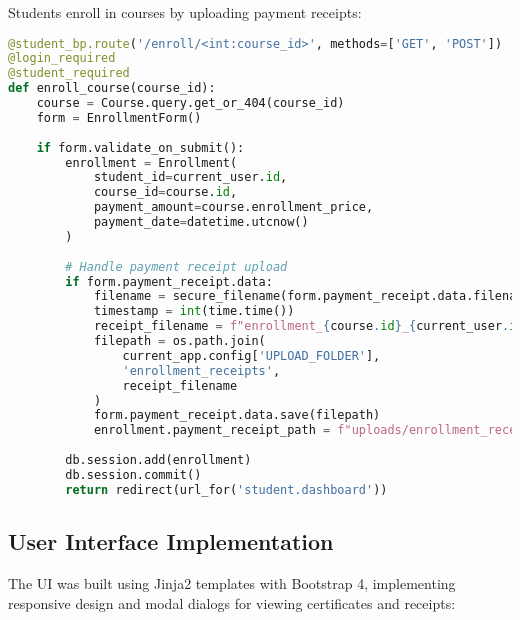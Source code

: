 Students enroll in courses by uploading payment receipts:

\begin{lstlisting}[language=Python, caption=Student Enrollment, label=lst:enrollment]
@student_bp.route('/enroll/<int:course_id>', methods=['GET', 'POST'])
@login_required
@student_required
def enroll_course(course_id):
    course = Course.query.get_or_404(course_id)
    form = EnrollmentForm()
    
    if form.validate_on_submit():
        enrollment = Enrollment(
            student_id=current_user.id,
            course_id=course.id,
            payment_amount=course.enrollment_price,
            payment_date=datetime.utcnow()
        )
        
        # Handle payment receipt upload
        if form.payment_receipt.data:
            filename = secure_filename(form.payment_receipt.data.filename)
            timestamp = int(time.time())
            receipt_filename = f"enrollment_{course.id}_{current_user.id}_{timestamp}_{filename}"
            filepath = os.path.join(
                current_app.config['UPLOAD_FOLDER'], 
                'enrollment_receipts', 
                receipt_filename
            )
            form.payment_receipt.data.save(filepath)
            enrollment.payment_receipt_path = f"uploads/enrollment_receipts/{receipt_filename}"
        
        db.session.add(enrollment)
        db.session.commit()
        return redirect(url_for('student.dashboard'))
\end{lstlisting}

\subsection{User Interface Implementation}

The UI was built using Jinja2 templates with Bootstrap 4, implementing responsive design and modal dialogs for viewing certificates and receipts:

